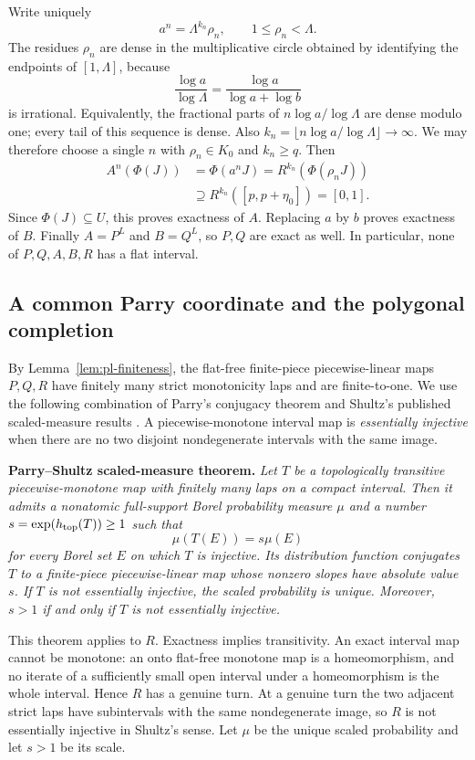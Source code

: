 \documentclass[11pt]{article}
\theoremstyle{definition}
\theoremstyle{remark}
\newcommand{\I}{[0,1]}
\begin{document}
Write uniquely
\[
 a^n=\Lambda^{k_n}\rho_n,\qquad1\leq\rho_n<\Lambda.
\]
The residues \(\rho_n\) are dense in the multiplicative circle obtained by
identifying the endpoints of \([1,\Lambda]\), because
\[
 \frac{\log a}{\log\Lambda}
 =\frac{\log a}{\log a+\log b}
\]
is irrational.  Equivalently, the fractional parts of
\(n\log a/\log\Lambda\) are dense modulo one; every tail of this sequence is
dense.  Also
\(k_n=\lfloor n\log a/\log\Lambda\rfloor\to\infty\).  We may therefore
choose a single \(n\) with \(\rho_n\in K_0\) and \(k_n\geq q\).
Then
\[
\begin{split}
 A^n(\Phi(J))
 &=\Phi(a^nJ)
 =R^{k_n}(\Phi(\rho_nJ))\\
 &\supseteq R^{k_n}([p,p+\eta_0])=\I.
\end{split}
\]
Since \(\Phi(J)\subseteq U\), this proves exactness of \(A\).  Replacing
\(a\) by \(b\) proves exactness of \(B\).  Finally \(A=P^L\) and \(B=Q^L\),
so \(P,Q\) are exact as well.  In particular, none of
\(P,Q,A,B,R\) has a flat interval.

\subsection{A common Parry coordinate and the polygonal completion}

By Lemma~\ref{lem:pl-finiteness}, the flat-free finite-piece piecewise-linear maps
\(P,Q,R\) have finitely many strict monotonicity laps and are finite-to-one.
We use the following combination of Parry's conjugacy theorem
\cite{Parry} and Shultz's published scaled-measure results
\cite[Propositions 3.6 and 4.3 and Corollaries 4.4 and 4.6]{Shultz}.  A
piecewise-monotone interval map is
\emph{essentially injective} when there are no two disjoint nondegenerate
intervals with the same image.

\medskip
\noindent\textbf{Parry--Shultz scaled-measure theorem.}
\emph{Let $T$ be a topologically transitive piecewise-monotone map with
finitely many laps on a compact interval.  Then it admits a nonatomic
full-support Borel
probability measure $\mu$ and a number
$s=\exp(h_{\rm top}(T))\geq1$ such that
\[
 \mu(T(E))=s\mu(E)
\]
for every Borel set $E$ on which $T$ is injective.  Its distribution function
conjugates $T$ to a finite-piece piecewise-linear map whose nonzero slopes
have absolute value $s$.  If $T$ is not essentially injective, the scaled
probability is unique.  Moreover, \(s>1\) if and only if \(T\) is not
essentially injective.}
\medskip

This theorem applies to $R$.  Exactness implies transitivity.  An exact
interval map cannot be monotone: an onto flat-free monotone map is a
homeomorphism, and
no iterate of a sufficiently small open interval under a homeomorphism is
the whole interval.  Hence $R$ has a genuine turn.  At a genuine turn the
two adjacent strict laps have subintervals with the same nondegenerate image,
so $R$ is not essentially injective in Shultz's sense.  Let $\mu$ be the
unique scaled probability and let $s>1$ be its scale.
\end{document}
